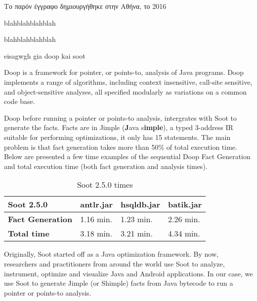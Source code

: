 \documentclass{dithesis}
\begin{document}
\begin{thesisprologue}[PROLOGUE]
    Το παρόν έγγραφο δημιουργήθηκε στην Αθήνα, το 2016 
    
    blahblahblahblah

    blahblahblahblah
\end{thesisprologue}

    eisagwgh gia doop kai soot

    Doop is a framework for pointer, or points-to, analysis of Java programs. Doop implements a range of algorithms, including context insensitive, call-site sensitive, and object-sensitive analyses, all specified modularly as variations on a common code base. 
    \cite{Doop: Framework for Java Pointer Analysis}

        Doop before running a pointer or points-to analysis, intergrates with Soot to generate the facts. Facts are in Jimple (\textbf{J}ava s\textbf{imple}), a typed 3-address IR suitable for performing optimizations, it only has 15 statements. The main problem is that fact generation takes more than 50\% of total execution time. Below are presented a few time examples of the sequential Doop Fact Generation and total execution time (both fact generation and analysis times). 

        \begin{table}[H]
            \centering
            \label{my-label}
            \begin{tabular}{llll}
                \hline
                \textbf{Soot 2.5.0}      & \textbf{antlr.jar} & \textbf{hsqldb.jar} & \textbf{batik.jar} \\ \hline
                \textbf{Fact Generation} & 1.16 min.          & 1.23 min.           & 2.26 min.          \\
                \textbf{Total time}      & 3.18 min.          & 3.21 min.           & 4.34 min.          \\ \hline
            \end{tabular}
            \caption{Soot 2.5.0 times}
        \end{table}



    Originally, Soot started off as a Java optimization framework. By now, researchers and practitioners from around the world use Soot to analyze, instrument, optimize and visualize Java and Android applications. In our case, we use Soot to generate Jimple (or Shimple) facts from Java bytecode to run a pointer or points-to analysis.
    \cite{Sable: Soot}
    
\end{document}
